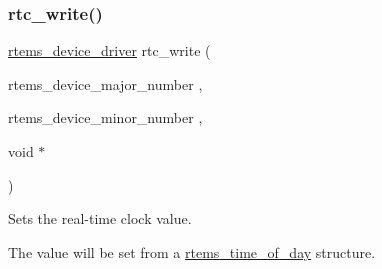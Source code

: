 \subsubsection{\texorpdfstring{rtc\_write()}{rtc\_write()}}
{\footnotesize\ttfamily \mbox{\hyperlink{group__ClassicStatus_ga545d41846817eaba6143d52ee4d9e9fe}{rtems\+\_\+device\+\_\+driver}} rtc\+\_\+write (\begin{DoxyParamCaption}\item[{rtems\+\_\+device\+\_\+major\+\_\+number}]{,  }\item[{rtems\+\_\+device\+\_\+minor\+\_\+number}]{,  }\item[{void $\ast$}]{ }\end{DoxyParamCaption})}

Sets the real-\/time clock value.

The value will be set from a \mbox{\hyperlink{structrtems__time__of__day}{rtems\+\_\+time\+\_\+of\+\_\+day}} structure. 